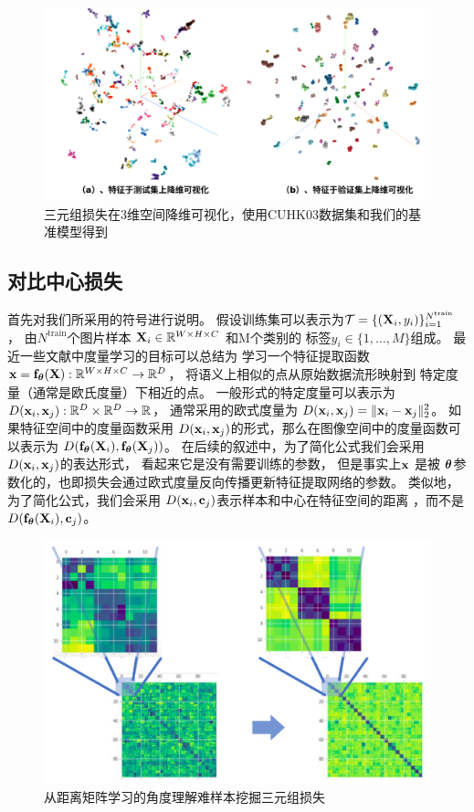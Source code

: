 \begin{figure}
	\centering
	\includegraphics[width=\textwidth]{fig/tsne.png}
	\caption{三元组损失在3维空间降维可视化，使用CUHK03数据集和我们的基准模型得到}
	\label{fig:tsne}
\end{figure}


\subsection{对比中心损失}

首先对我们所采用的符号进行说明。
假设训练集可以表示为$\mathcal{T}=\{({\mathbf{X}}_i,y_i)\}_{i=1}^{N^{\textrm{train}}}$， 由$N^{\textrm{train}}$个图片样本
${\mathbf{X}}_i \in {\mathbb{R}}^{W\times H\times C}$
和M个类别的
标签$y_i \in \{1,\dots, M\}$组成。
最近一些文献中度量学习的目标可以总结为
学习一个特征提取函数
${\mathbf{x}} = {\mathbf{f}}_{\boldsymbol{\theta}} ({\mathbf{X}}): {\mathbb{R}}^{W \times H\times C} \rightarrow \mathbb{R}^D$，
将语义上相似的点从原始数据流形映射到
特定度量（通常是欧氏度量）下相近的点。
一般形式的特定度量可以表示为$D( {\mathbf{x}}_i, {\mathbf{x}}_j):\mathbb{R}^D \times \mathbb{R}^D \rightarrow \mathbb{R}$，
通常采用的欧式度量为
$D({\mathbf{x}}_i,{\mathbf{x}}_j)=\|{\mathbf{x}}_i - {\mathbf{x}}_j\|_2^2$。
如果特征空间中的度量函数采用
$D({\mathbf{x}}_i,  {\mathbf{x}}_j)$的形式，那么在图像空间中的度量函数可以表示为
$D({\mathbf{f}}_{\boldsymbol{\theta}}({\mathbf{X}}_i), {\mathbf{f}}_{\boldsymbol{\theta}}({\mathbf{X}}_j))$。
在后续的叙述中，为了简化公式我们会采用$D({\mathbf{x}}_i,  {\mathbf{x}}_j)$的表达形式，
看起来它是没有需要训练的参数，
但是事实上${\mathbf{x}}$ 是被 ${\boldsymbol{\theta}}$参数化的，也即损失会通过欧式度量反向传播更新特征提取网络的参数。
类似地，
为了简化公式，我们会采用
$D({\mathbf{x}}_i,{\mathbf{c}}_j)$表示样本和中心在特征空间的距离
，而不是$D({\mathbf{f}}_{\boldsymbol{\theta}}({\mathbf{X}}_i), {\mathbf{c}}_j)$。

\begin{figure}
	\centering 
	\includegraphics[width=\textwidth]{fig/2018-05-19-23-27-39.png}
\caption{从距离矩阵学习的角度理解难样本挖掘三元组损失} \label{fig:distmat-tri}
\end{figure}

